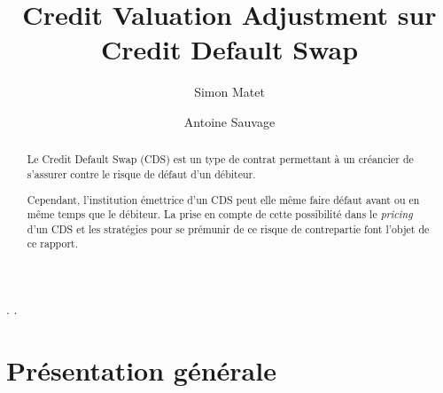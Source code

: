 \documentclass[a4paper]{article}
\title{Credit Valuation Adjustment sur Credit Default Swap}           %
\author{Simon Matet \and Antoine Sauvage}
\date{}                       %
\begin{document}
\maketitle                    %

\begin{abstract}
Le Credit Default Swap (CDS) est un type de contrat permettant à un créancier de s'assurer contre le risque de défaut d'un débiteur.
 
Cependant, l'institution émettrice d'un CDS peut elle même faire défaut avant ou en même temps que le débiteur.
 La prise en compte de cette possibilité dans le \textit{pricing} d'un CDS et les stratégies pour se prémunir de ce risque de contrepartie font l'objet de ce rapport.

\end{abstract}

\tableofcontents              %

.
.


\section{Présentation générale}               %
\end{document}
